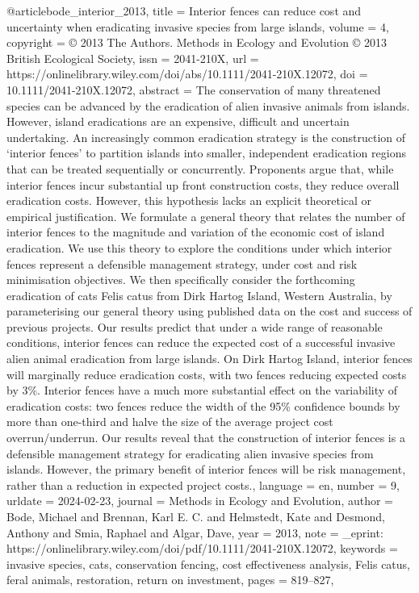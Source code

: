 {{{{@article{bode_interior_2013,
	title = {Interior fences can reduce cost and uncertainty when eradicating invasive species from large islands},
	volume = {4},
	copyright = {© 2013 The Authors. Methods in Ecology and Evolution © 2013 British Ecological Society},
	issn = {2041-210X},
	url = {https://onlinelibrary.wiley.com/doi/abs/10.1111/2041-210X.12072},
	doi = {10.1111/2041-210X.12072},
	abstract = {The conservation of many threatened species can be advanced by the eradication of alien invasive animals from islands. However, island eradications are an expensive, difficult and uncertain undertaking. An increasingly common eradication strategy is the construction of ‘interior fences’ to partition islands into smaller, independent eradication regions that can be treated sequentially or concurrently. Proponents argue that, while interior fences incur substantial up front construction costs, they reduce overall eradication costs. However, this hypothesis lacks an explicit theoretical or empirical justification. We formulate a general theory that relates the number of interior fences to the magnitude and variation of the economic cost of island eradication. We use this theory to explore the conditions under which interior fences represent a defensible management strategy, under cost and risk minimisation objectives. We then specifically consider the forthcoming eradication of cats Felis catus from Dirk Hartog Island, Western Australia, by parameterising our general theory using published data on the cost and success of previous projects. Our results predict that under a wide range of reasonable conditions, interior fences can reduce the expected cost of a successful invasive alien animal eradication from large islands. On Dirk Hartog Island, interior fences will marginally reduce eradication costs, with two fences reducing expected costs by 3\%. Interior fences have a much more substantial effect on the variability of eradication costs: two fences reduce the width of the 95\% confidence bounds by more than one-third and halve the size of the average project cost overrun/underrun. Our results reveal that the construction of interior fences is a defensible management strategy for eradicating alien invasive species from islands. However, the primary benefit of interior fences will be risk management, rather than a reduction in expected project costs.},
	language = {en},
	number = {9},
	urldate = {2024-02-23},
	journal = {Methods in Ecology and Evolution},
	author = {Bode, Michael and Brennan, Karl E. C. and Helmstedt, Kate and Desmond, Anthony and Smia, Raphael and Algar, Dave},
	year = {2013},
	note = {\_eprint: https://onlinelibrary.wiley.com/doi/pdf/10.1111/2041-210X.12072},
	keywords = {invasive species, cats, conservation fencing, cost effectiveness analysis, Felis catus, feral animals, restoration, return on investment},
	pages = {819--827},
}

}}}}
